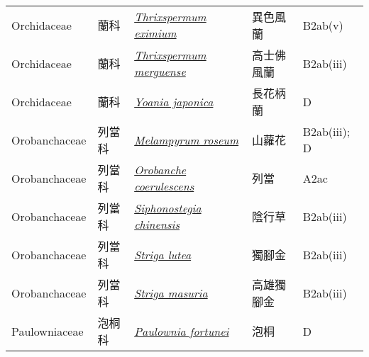 {\begin{longtable}{L{2.5cm}L{2cm}L{5cm}L{2.5cm}L{3cm}}
    Orchidaceae & 蘭科 & \href{http://www.theplantlist.org/tpl1.1/search?q=Thrixspermum+eximium}{\textit{Thrixspermum eximium} } & 異色風蘭 & B2ab(v)    \\
    Orchidaceae & 蘭科 & \href{http://www.theplantlist.org/tpl1.1/search?q=Thrixspermum+merguense}{\textit{Thrixspermum merguense} } & 高士佛風蘭 & B2ab(iii)    \\
    Orchidaceae & 蘭科 & \href{http://www.theplantlist.org/tpl1.1/search?q=Yoania+japonica}{\textit{Yoania japonica} } & 長花柄蘭 & D    \\
    Orobanchaceae & 列當科 & \href{http://www.theplantlist.org/tpl1.1/search?q=Melampyrum+roseum}{\textit{Melampyrum roseum} } & 山蘿花 & B2ab(iii); D    \\
    Orobanchaceae & 列當科 & \href{http://www.theplantlist.org/tpl1.1/search?q=Orobanche+coerulescens}{\textit{Orobanche coerulescens} } & 列當 & A2ac    \\
    Orobanchaceae & 列當科 & \href{http://www.theplantlist.org/tpl1.1/search?q=Siphonostegia+chinensis}{\textit{Siphonostegia chinensis} } & 陰行草 & B2ab(iii)    \\
    Orobanchaceae & 列當科 & \href{http://www.theplantlist.org/tpl1.1/search?q=Striga+lutea}{\textit{Striga lutea} } & 獨腳金 & B2ab(iii)    \\
    Orobanchaceae & 列當科 & \href{http://www.theplantlist.org/tpl1.1/search?q=Striga+masuria}{\textit{Striga masuria} } & 高雄獨腳金 & B2ab(iii)    \\
    Paulowniaceae & 泡桐科 & \href{http://www.theplantlist.org/tpl1.1/search?q=Paulownia+fortunei}{\textit{Paulownia fortunei} } & 泡桐 & D    \\

\end{longtable}}
